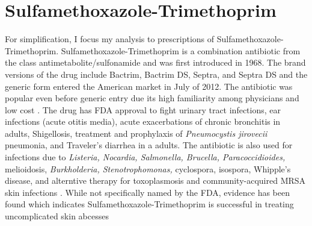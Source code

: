 \section{Sulfamethoxazole-Trimethoprim}
\indent For simplification, I focus my analysis to prescriptions of Sulfamethoxazole-Trimethoprim. Sulfamethoxazole-Trimethoprim is a combination antibiotic from the class antimetabolite/sulfonamide and was first introduced in 1968. The brand versions of the drug include Bactrim, Bactrim DS, Septra, and Septra DS and the generic form entered the American market in July of 2012. The antibiotic was popular even before generic entry due its high familiarity among physicians and low cost \cite{noauthor_sulfamethoxazole_nodate,ho_considerations_2011}. The drug has FDA approval to fight urinary tract infections, ear infections (acute otitis media), acute exacerbations of chronic bronchitis in adults, Shigellosis, treatment and prophylaxis of \textit{Pneumocystis jirovecii} pneumonia, and Traveler's diarrhea in a adults. The antibiotic is also used for infections due to \textit{Listeria, Nocardia, Salmonella, Brucella, Paracoccidioides,} melioidosis, \textit{Burkholderia, Stenotrophomonas,} cyclospora, isospora, Whipple's disease, and alterntive therapy for toxoplasmosis and community-acquired MRSA skin infections \cite{schlossberg_antibiotics_2017}. While not specifically named by the FDA, evidence has been found which indicates Sulfamethoxazole-Trimethoprim is successful in treating uncomplicated skin abcesses \cite{noauthor_trimethoprimsulfamethoxazole_nodate}\\
